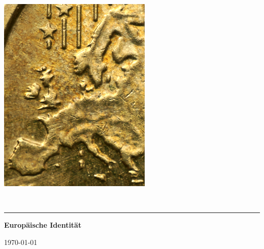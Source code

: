\documentclass[11pt,a4paper]{article}
\def\firstname{Pascal}
\def\familyname{Bernhard}
\begin{document}
\sffamily   %
\hfill%
\begin{minipage}[t]{.6\textwidth}
\raggedleft%
\includegraphics[width=0.55\textwidth]{Europa-auf-Muenze.jpg}


\end{minipage}\\[0.5em]
%
{\color{firstnamecolor}\rule{\textwidth}{.25ex}}
%
\begin{minipage}[t]{.4\textwidth}
	\raggedright%
	\vspace*{1em}
	\textbf{Europäische Identität} \\
	\small%
\end{minipage}
%
\hfill
%
\begin{minipage}[t]{.4\textwidth}
	\raggedleft %
	\today
\end{minipage}\\[2.2em]


{\bfseries \color{familynamecolor}{Wurzeln der Europäischen Identität}}\\[0.75em]
\end{document}
